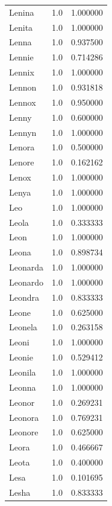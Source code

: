 \documentclass[
  letterpaper,
  DIV=11,
  numbers=noendperiod]{scrreprt}
\begin{document}
\begin{tabular}{lrr}
Lenina          &   1.0 &   1.000000 \\
Lenita          &   1.0 &   1.000000 \\
Lenna           &   1.0 &   0.937500 \\
Lennie          &   1.0 &   0.714286 \\
Lennix          &   1.0 &   1.000000 \\
Lennon          &   1.0 &   0.931818 \\
Lennox          &   1.0 &   0.950000 \\
Lenny           &   1.0 &   0.600000 \\
Lennyn          &   1.0 &   1.000000 \\
Lenora          &   1.0 &   0.500000 \\
Lenore          &   1.0 &   0.162162 \\
Lenox           &   1.0 &   1.000000 \\
Lenya           &   1.0 &   1.000000 \\
Leo             &   1.0 &   1.000000 \\
Leola           &   1.0 &   0.333333 \\
Leon            &   1.0 &   1.000000 \\
Leona           &   1.0 &   0.898734 \\
Leonarda        &   1.0 &   1.000000 \\
Leonardo        &   1.0 &   1.000000 \\
Leondra         &   1.0 &   0.833333 \\
Leone           &   1.0 &   0.625000 \\
Leonela         &   1.0 &   0.263158 \\
Leoni           &   1.0 &   1.000000 \\
Leonie          &   1.0 &   0.529412 \\
Leonila         &   1.0 &   1.000000 \\
Leonna          &   1.0 &   1.000000 \\
Leonor          &   1.0 &   0.269231 \\
Leonora         &   1.0 &   0.769231 \\
Leonore         &   1.0 &   0.625000 \\
Leora           &   1.0 &   0.466667 \\
Leota           &   1.0 &   0.400000 \\
Lesa            &   1.0 &   0.101695 \\
Lesha           &   1.0 &   0.833333 \\

\end{tabular}
\end{document}
